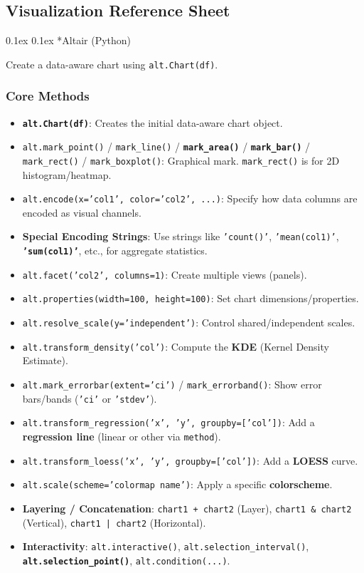 \documentclass[8pt,landscape]{article}
\makeatletter
\renewcommand{\subsection}{\@startsection{subsection}{2}{0pt}%
    {0.1ex}%
    {0.1ex}%
    {\fontsize{8}{9}\bfseries\color{blue}}} %
\newcommand{\code}[1]{\textcolor{myred}{\texttt{#1}}}
\newcommand{\smalltext}[1]{%
  {\fontsize{8}{9}\selectfont\sloppy #1\par}%
}
\makeatother
\begin{document}
\fontsize{8}{9}\selectfont %
\pagestyle{empty}
\begin{multicols}{3}

\section*{Visualization Reference Sheet}

\subsection*{Altair (Python)}
\smalltext{Create a data-aware chart using \code{alt.Chart(df)}.}

\subsubsection*{Core Methods}
\begin{itemize}
\item \textbf{\code{alt.Chart(df)}}: Creates the initial data-aware chart object.
\item \code{alt.mark\_point()} / \code{mark\_line()} / \textbf{\code{mark\_area()}} / \textbf{\code{mark\_bar()}} / \code{mark\_rect()} / \code{mark\_boxplot()}: Graphical mark. \code{mark\_rect()} is for 2D histogram/heatmap.
\item \code{alt.encode(x='col1', color='col2', ...)}: Specify how data columns are encoded as visual channels.
\item \textbf{Special Encoding Strings}: Use strings like \code{'count()'}, \code{'mean(col1)'}, \textbf{\code{'sum(col1)'}}, etc., for aggregate statistics.
\item \code{alt.facet('col2', columns=1)}: Create multiple views (panels).
\item \code{alt.properties(width=100, height=100)}: Set chart dimensions/properties.
\item \code{alt.resolve\_scale(y='independent')}: Control shared/independent scales.
\item \code{alt.transform\_density('col')}: Compute the \textbf{KDE} (Kernel Density Estimate).
\item \code{alt.mark\_errorbar(extent='ci')} / \code{mark\_errorband()}: Show error bars/bands (\code{'ci'} or \code{'stdev'}).
\item \code{alt.transform\_regression('x', 'y', groupby=['col'])}: Add a \textbf{regression line} (linear or other via \code{method}).
\item \code{alt.transform\_loess('x', 'y', groupby=['col'])}: Add a \textbf{LOESS} curve.
\item \code{alt.scale(scheme='colormap name')}: Apply a specific \textbf{colorscheme}.
\item \textbf{Layering / Concatenation}: \code{chart1 + chart2} (Layer), \code{chart1 \& chart2} (Vertical), \code{chart1 | chart2} (Horizontal).
\item \textbf{Interactivity}: \code{alt.interactive()}, \code{alt.selection\_interval()}, \textbf{\code{alt.selection\_point()}}, \code{alt.condition(...)}.
\end{itemize}


\end{multicols}
\end{document}

